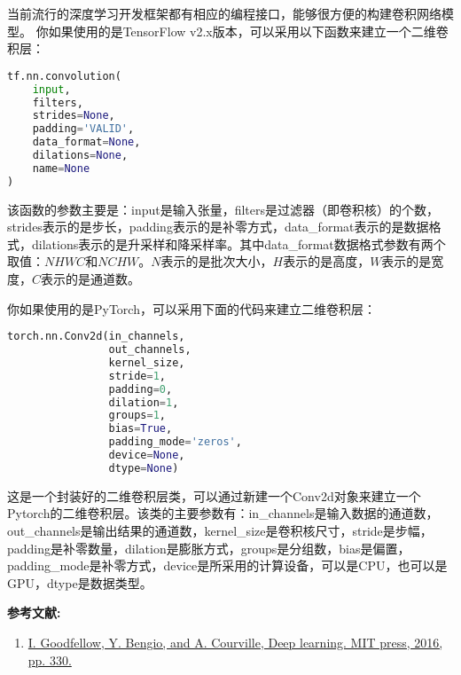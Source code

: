 当前流行的深度学习开发框架都有相应的编程接口，能够很方便的构建卷积网络模型。
你如果使用的是TensorFlow v2.x版本，可以采用以下函数来建立一个二维卷积层：
\begin{lstlisting}[language=python]
tf.nn.convolution(
    input,
    filters,
    strides=None,
    padding='VALID',
    data_format=None,
    dilations=None,
    name=None
)
\end{lstlisting}
该函数的参数主要是：input是输入张量，filters是过滤器（即卷积核）的个数，strides表示的是步长，padding表示的是补零方式，data\_format表示的是数据格式，dilations表示的是升采样和降采样率。其中data\_format数据格式参数有两个取值：$NHWC$和$NCHW$。$N$表示的是批次大小，$H$表示的是高度，$W$表示的是宽度，$C$表示的是通道数。

你如果使用的是PyTorch，可以采用下面的代码来建立二维卷积层：
\begin{lstlisting}[language=python]
torch.nn.Conv2d(in_channels, 
                out_channels, 
                kernel_size,
                stride=1, 
                padding=0,
                dilation=1,
                groups=1,
                bias=True,
                padding_mode='zeros',
                device=None,
                dtype=None)
\end{lstlisting}
这是一个封装好的二维卷积层类，可以通过新建一个Conv2d对象来建立一个Pytorch的二维卷积层。该类的主要参数有：in\_channels是输入数据的通道数，out\_channels是输出结果的通道数，kernel\_size是卷积核尺寸，stride是步幅，padding是补零数量，dilation是膨胀方式，groups是分组数，bias是偏置，padding\_mode是补零方式，device是所采用的计算设备，可以是CPU，也可以是GPU，dtype是数据类型。


\textbf{参考文献:}
\begin{enumerate}
\item \href{https://link.springer.com/article/10.1007/s10710-017-9314-z}{I. Goodfellow, Y. Bengio, and A. Courville, Deep learning. MIT press, 2016, pp. 330.}
\end{enumerate}
